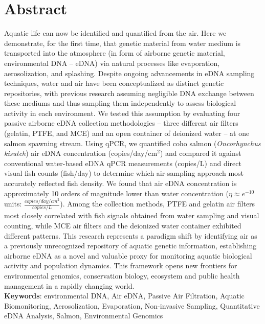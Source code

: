 \documentclass{article}
\begin{document}
\section*{Abstract}
Aquatic life can now be identified and quantified from the air. Here we demonstrate, for the first time, that genetic material from water medium is transported into the atmosphere (in form of airborne genetic material, environmental DNA -- eDNA) via natural processes like evaporation, aerosolization, and splashing. Despite ongoing advancements in eDNA sampling techniques, water and air have been conceptualized as distinct genetic repositories, with previous research assuming negligible DNA exchange between these mediums and thus sampling them independently to assess biological activity in each environment. We tested this assumption by evaluating four passive airborne eDNA collection methodologies -- three different air filters (gelatin, PTFE, and MCE) and an open container of deionized water -- at one salmon spawning stream. Using qPCR, we quantified coho salmon (\textit{Oncorhynchus kisutch}) air eDNA concentration (copies/day/cm$^2$) and compared it against conventional water-based eDNA qPCR measurements (copies/L) and direct visual fish counts (fish/day) to determine which air-sampling approach most accurately reflected fish density. We found that air eDNA concentration is approximately 10 orders of magnitude lower than water concentration ($\eta \approx e^{-10}$ units: $\frac{copies/day/cm^2}{copies/L}$). Among the collection methods, PTFE and gelatin air filters most closely correlated with fish signals obtained from water sampling and visual counting, while MCE air filters and the deionized water container exhibited different patterns. This research represents a paradigm shift by identifying air as a previously unrecognized repository of aquatic genetic information, establishing airborne eDNA as a novel and valuable proxy for monitoring aquatic biological activity and population dynamics. This framework opens new frontiers for environmental genomics, conservation biology, ecosystem and public health management in a rapidly changing world.\\


\textbf{Keywords}: environmental DNA, Air eDNA, Passive Air Filtration, Aquatic Biomonitoring, Aerosolization, Evaporation, Non-invasive Sampling, Quantitative eDNA Analysis, Salmon, Environmental Genomics
\end{document}
